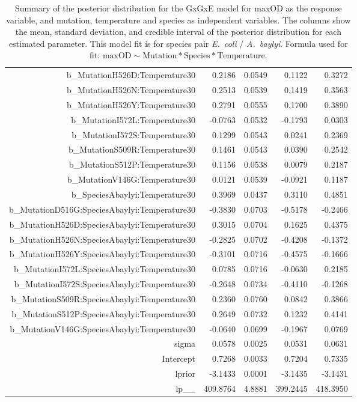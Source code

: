 \begin{table}[ht]
\begin{tabular}{rrrrr}
  b\_MutationH526D:Temperature30 & 0.2186 & 0.0549 & 0.1122 & 0.3272 \\ 
  b\_MutationH526N:Temperature30 & 0.2513 & 0.0539 & 0.1419 & 0.3563 \\ 
  b\_MutationH526Y:Temperature30 & 0.2791 & 0.0555 & 0.1700 & 0.3890 \\ 
  b\_MutationI572L:Temperature30 & -0.0763 & 0.0532 & -0.1793 & 0.0303 \\ 
  b\_MutationI572S:Temperature30 & 0.1299 & 0.0543 & 0.0241 & 0.2369 \\ 
  b\_MutationS509R:Temperature30 & 0.1461 & 0.0543 & 0.0390 & 0.2542 \\ 
  b\_MutationS512P:Temperature30 & 0.1156 & 0.0538 & 0.0079 & 0.2187 \\ 
  b\_MutationV146G:Temperature30 & 0.0121 & 0.0539 & -0.0921 & 0.1187 \\ 
  b\_SpeciesAbaylyi:Temperature30 & 0.3969 & 0.0437 & 0.3110 & 0.4851 \\ 
  b\_MutationD516G:SpeciesAbaylyi:Temperature30 & -0.3830 & 0.0703 & -0.5178 & -0.2466 \\ 
  b\_MutationH526D:SpeciesAbaylyi:Temperature30 & 0.3015 & 0.0704 & 0.1625 & 0.4375 \\ 
  b\_MutationH526N:SpeciesAbaylyi:Temperature30 & -0.2825 & 0.0702 & -0.4208 & -0.1372 \\ 
  b\_MutationH526Y:SpeciesAbaylyi:Temperature30 & -0.3101 & 0.0716 & -0.4575 & -0.1666 \\ 
  b\_MutationI572L:SpeciesAbaylyi:Temperature30 & 0.0785 & 0.0716 & -0.0630 & 0.2185 \\ 
  b\_MutationI572S:SpeciesAbaylyi:Temperature30 & -0.2648 & 0.0734 & -0.4110 & -0.1268 \\ 
  b\_MutationS509R:SpeciesAbaylyi:Temperature30 & 0.2360 & 0.0760 & 0.0842 & 0.3866 \\ 
  b\_MutationS512P:SpeciesAbaylyi:Temperature30 & 0.2649 & 0.0732 & 0.1232 & 0.4141 \\ 
  b\_MutationV146G:SpeciesAbaylyi:Temperature30 & -0.0640 & 0.0699 & -0.1967 & 0.0769 \\ 
  sigma & 0.0578 & 0.0025 & 0.0531 & 0.0631 \\ 
  Intercept & 0.7268 & 0.0033 & 0.7204 & 0.7335 \\ 
  lprior & -3.1433 & 0.0001 & -3.1435 & -3.1431 \\ 
  lp\_\_ & 409.8764 & 4.8881 & 399.2445 & 418.3950 \\ 
   \hline
\end{tabular}
\endgroup
\caption{Summary of the posterior distribution for the GxGxE model for maxOD as the response variable, and mutation, temperature and species as independent variables. The columns show the mean, standard deviation, and credible interval of the posterior distribution for each estimated parameter. This model fit is for species pair \textit{E.~coli} / \textit{A.~baylyi}. Formula used for fit: $\text{maxOD} \sim \text{Mutation} * \text{Species} * \text{Temperature}$.} 
\label{supptab:GxGxE_maxOD}
\end{table}



